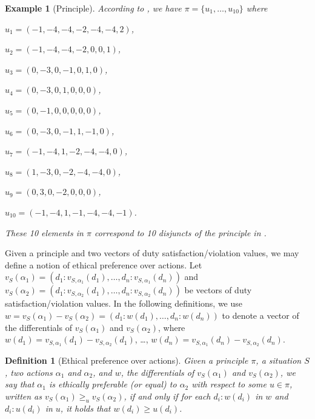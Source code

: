 \documentclass[letterpaper]{article} %
\newtheorem{definition}{Definition}
\newtheorem{example}{Example}
\begin{document}
\begin{example}[Principle]
According to \cite{DBLP:journals/pieee/Anderson19}, we have
$\pi = \{u_1, \dots, u_{10}\}$ where 
\begin{description}
\item $u_1 = (-1, -4, -4, -2, -4, -4, 2)$,
\item $u_2 = (-1, -4, -4, -2, 0, 0, 1)$,
\item $u_3 = (0, -3, 0, -1, 0, 1, 0)$,
\item $u_4 = (0, -3, 0, 1, 0, 0, 0)$,
\item $u_5 = (0, -1, 0, 0, 0, 0, 0)$,
\item $u_6 = (0, -3, 0, -1, 1, -1, 0)$,
\item $u_7 = (-1, -4, 1, -2, -4, -4, 0)$,
\item $u_8 = (1, -3, 0, -2, -4, -4, 0)$,
\item $u_9 = (0, 3, 0, -2, 0, 0, 0)$,
\item $u_{10} = (-1, -4, 1, -1, -4, -4, -1)$.
\end{description}
These 10 elements in $\pi$ correspond to 10 disjuncts of the principle in  \cite{DBLP:journals/pieee/Anderson19}.
\end{example}

Given a principle and two vectors of duty satisfaction/violation values, we may define a notion of ethical preference over actions. 
Let $v_{S}(\alpha_1) = ( d_1: v_{S,\alpha_1}(d_1), \dots, d_n: v_{S, \alpha_1}(d_n))$ and $v_{S}(\alpha_2) = ( d_1: v_{S,\alpha_2}(d_1), \dots, d_n: v_{S, \alpha_2}(d_n))$ be vectors of duty satisfaction/violation values. In the following definitions, we use 
 $w = v_{S}(\alpha_1) - v_{S}(\alpha_2) = (d_1: w(d_1), \dots, d_n: w(d_n))$ to denote a vector of the differentials of $v_{S}(\alpha_1)$ and $v_{S}(\alpha_2)$, where $w(d_1) = v_{S,\alpha_1}(d_1) - v_{S,\alpha_2}(d_1)$, \dots, $w(d_n) = v_{S,\alpha_1}(d_n) - v_{S,\alpha_2}(d_n)$. 
 
 \begin{definition}[Ethical preference over actions]
 Given a principle $\pi$, a situation $S$, two actions $\alpha_1$ and $\alpha_2$, and $w$, the differentials of $v_{S}(\alpha_1)$ and $v_{S}(\alpha_2)$, we say that $\alpha_1$ is ethically preferable (or equal) to $\alpha_2$ with respect to some $u\in \pi$, written as $v_{S}(\alpha_1) \ge_u v_{S}(\alpha_2)$, if and only if  for each $d_i: w(d_i)$ in $w$ and $d_i: u(d_i)$ in $u$, it holds that $w(d_i) \ge  u(d_i)$.
\end{definition}
\end{document}
